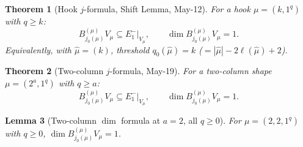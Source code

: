 \documentclass[11pt]{article}
\newtheorem{theorem}{Theorem}
\newtheorem{lemma}[theorem]{Lemma}
\theoremstyle{definition}
\begin{document}
\begin{theorem}[Hook $j$-formula, Shift Lemma, May-12]\label{thm:hook}
For a hook $\mu = (k, 1^q)$ with $q \ge k$:
\[
   B^{(\mu)}_{j_0(\mu)} V_\mu \subseteq E_1^-|_{V_\mu},
   \qquad \dim B^{(\mu)}_{j_0(\mu)} V_\mu = 1.
\]
Equivalently, with $\widehat\mu = (k)$, threshold $q_0(\widehat\mu) = k$
($= |\widehat\mu| - 2\ell(\widehat\mu) + 2$).
\end{theorem}

\begin{theorem}[Two-column $j$-formula, May-19]\label{thm:two-col}
For a two-column shape $\mu = (2^a, 1^q)$ with $q \ge a$:
\[
   B^{(\mu)}_{j_0(\mu)} V_\mu \subseteq E_1^-|_{V_\mu},
   \qquad \dim B^{(\mu)}_{j_0(\mu)} V_\mu = 1.
\]
\end{theorem}

\begin{lemma}[Two-column $\dim$ formula at $a = 2$, all $q \ge 0$]\label{lem:22-dim}
For $\mu = (2, 2, 1^q)$ with $q \ge 0$, $\dim B^{(\mu)}_{j_0(\mu)} V_\mu = 1$.
\end{lemma}
\end{document}
